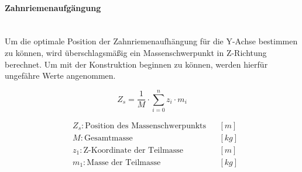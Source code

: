 \paragraph{Zahnriemenaufgängung}\mbox{}\\
Um die optimale Position der Zahnriemenaufhängung für die Y-Achse bestimmen zu können, wird überschlagsmäßig ein Massenschwerpunkt in Z-Richtung berechnet. Um mit der Konstruktion beginnen zu können, werden hierfür ungefähre Werte angenommen.

\noindent\begin{minipage}{\textwidth}
\begin{minipage}[t]{0.5\textwidth}
    \vspace{7mm}
    \begin{equation*}
        Z_s = \frac{1}{M} \cdot \displaystyle\sum_{i = 0}^{n} z_i \cdot m_i
    \end{equation*}
\end{minipage}%
\begin{minipage}[t]{0.5\textwidth}
    \begin{align*}
        &Z_s: \text{Position des Massenschwerpunkts} & &\left[m\right]\\
        &M: \text{Gesamtmasse} & &\left[kg\right]\\
        &z_1: \text{Z-Koordinate der Teilmasse} & &\left[m\right] \\
        &m_1: \text{Masse der Teilmasse} & &\left[kg\right]
    \end{align*}
\end{minipage}
\end{minipage}

